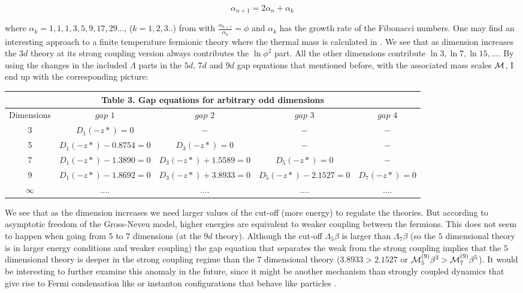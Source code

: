 \documentclass[twoside]{article}
\begin{document}
\begin{equation}
\alpha_{n+1}=2\alpha_n+\alpha_k
\end{equation}

where $\alpha_k=1,1,1,3,5,9,17,29...$, ($k=1,2,3..$) from \cite{OEIS} with $\frac{\alpha_{k+1}}{\alpha_{k}}=\phi$ and $\alpha_k$ has the growth rate of the Fibonacci numbers. One may find an interesting approach to a finite temperature fermionic theory where the thermal mass is calculated in \cite{David}. 
We see that as dimension increases the $3d$ theory at its strong coupling version always contributes the $\ln\phi^2$ part. All the other dimensions contribute $\ln3, \ln7, \ln15, ...$. By using the changes in the included $\Lambda$ parts in the $5d$, $7d$ and $9d$ gap equations that mentioned before, with the associated mass scales ${\cal M}$, I end up with the corresponding picture:

{\centering
	\begin{tabular}{|c|c|c|c|c|}
		\hline 
		\multicolumn{5}{|c|}{\textbf{Table 3. Gap equations for arbitrary odd dimensions}} \\ 
		\hline 
		Dimensions & $gap\,\,1$ & $gap\,\,2$ & $gap\,\,3$ & $gap\,\,4$ \\ 
		\hline 
		3 & $D_1(-z*)=0$ & $-$ & $-$ & $-$ \\ 
		\hline 
		5 & $D_1(-z*)-0.8754=0$ & $D_3(-z*)=0$ & $-$ & $-$ \\ 
		\hline 
		7 & $D_1(-z*)-1.3890=0$ & $D_3(-z*)+1.5589=0$ & $D_5(-z*)=0$ & $-$ \\ 
		\hline
		9 & $D_1(-z*)-1.8692=0$ & $D_3(-z*)+3.8933=0$ & $D_5(-z*)-2.1527=0$ & $D_7(-z*)=0$ \\ 
		\hline 
		$\infty$ & $....$ &  $....$ & $....$ & $....$ \\
		\hline 
	\end{tabular}\par}
	
We see that as the dimension increases we need larger values of the cut-off (more energy) to regulate the theories. But according to asymptotic freedom of the Gross-Neveu model, higher energies are equivalent to weaker coupling between the fermions. This does not seem to happen when going from $5$ to $7$ dimensions (at the $9d$ theory). Although the cut-off $\Lambda_5\beta$ is larger than $\Lambda_7\beta$ (so the $5$ dimensional theory is in larger energy conditions and weaker coupling) the gap equation that separates the weak from the strong coupling implies that the $5$ dimensional theory is deeper in the strong coupling regime than the $7$ dimensional theory ($3.8933>2.1527$ or ${\cal M}_5^{(9)}\beta^3>{\cal M}_7^{(9)}\beta^5$). It would be interesting to further examine this anomaly in the future, since it might be another mechanism than strongly coupled dynamics that give rise to Fermi condensation like \cite{Chu} or instanton configurations that behave like particles \cite{Genolini}.	
\end{document}

